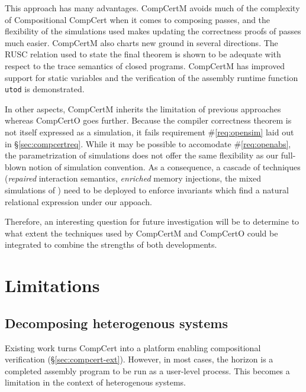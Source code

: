 \documentclass[11pt,oneside,draft]{book}
\theoremstyle{definition}
\begin{document}
This approach has many advantages.
CompCertM avoids much of the complexity
of Compositional CompCert
when it comes to composing passes,
and the flexibility of the simulations used
makes updating the correctness proofs of passes much easier.
CompCertM also charts new ground in several directions.
The RUSC relation used to state the final theorem
is shown to be adequate with respect to the trace semantics
of closed programs.
CompCertM has improved support for static variables
and the verification of
the assembly runtime function \texttt{utod} is demonstrated.

In other aspects,
CompCertM inherits the limitation of previous approaches
whereas CompCertO goes further.
Because the compiler correctness theorem
is not itself expressed as a simulation,
it fails requirement \#\ref{req:opensim}
laid out in \S\ref{sec:compcertreq}.
While it may be possible to accomodate \#\ref{req:openabs},
the parametrization of simulations
does not offer the same flexibility as
our full-blown notion of simulation convention.
As a consequence, a cascade of techniques
(\emph{repaired} interaction semantics,
\emph{enriched} memory injections,
the mixed simulations of \citep{pilsner})
need to be deployed to enforce invariants
which find a natural relational expression
under our appoach.

Therefore,
an interesting question for future investigation
will be to determine to what extent
the techniques used by CompCertM and CompCertO
could be integrated to combine
the strengths of both developments.




\section{Limitations} \label{sec:compcertlim} %

\subsection{Decomposing heterogenous systems} %

Existing work turns CompCert
into a platform enabling compositional verification
(\S\ref{sec:compcert-ext}).
However, in most cases,
the horizon is a completed assembly program to be run as a user-level process.
This becomes a limitation in the context of heterogenous systems.
\end{document}
